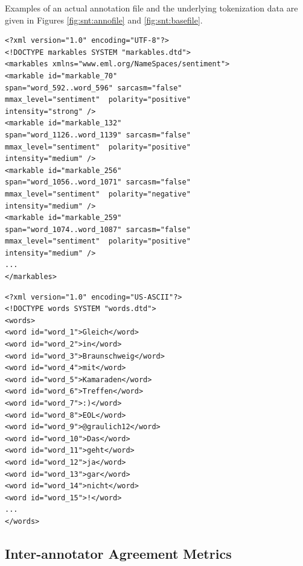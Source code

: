 Examples of an actual annotation file and the underlying tokenization
data are given in Figures \ref{fig:snt:annofile} and
\ref{fig:snt:basefile}.

\begin{minipage}[t]{\textwidth}
  \begin{minipage}[t]{0.45\textwidth}
    \lstset{language=XML}
    \begin{lstlisting}
<?xml version="1.0" encoding="UTF-8"?>
<!DOCTYPE markables SYSTEM "markables.dtd">
<markables xmlns="www.eml.org/NameSpaces/sentiment">
<markable id="markable_70"
span="word_592..word_596" sarcasm="false"
mmax_level="sentiment"  polarity="positive"
intensity="strong" />
<markable id="markable_132"
span="word_1126..word_1139" sarcasm="false"
mmax_level="sentiment"  polarity="positive"
intensity="medium" />
<markable id="markable_256"
span="word_1056..word_1071" sarcasm="false"
mmax_level="sentiment"  polarity="negative"
intensity="medium" />
<markable id="markable_259"
span="word_1074..word_1087" sarcasm="false"
mmax_level="sentiment"  polarity="positive"
intensity="medium" />
...
</markables>
    \end{lstlisting}%
  \end{minipage}\hfill%
  \begin{minipage}[t]{0.45\textwidth}%
    \lstset{language=XML}
    \begin{lstlisting}[basicstyle=\tiny]
<?xml version="1.0" encoding="US-ASCII"?>
<!DOCTYPE words SYSTEM "words.dtd">
<words>
<word id="word_1">Gleich</word>
<word id="word_2">in</word>
<word id="word_3">Braunschweig</word>
<word id="word_4">mit</word>
<word id="word_5">Kamaraden</word>
<word id="word_6">Treffen</word>
<word id="word_7">:)</word>
<word id="word_8">EOL</word>
<word id="word_9">@graulich12</word>
<word id="word_10">Das</word>
<word id="word_11">geht</word>
<word id="word_12">ja</word>
<word id="word_13">gar</word>
<word id="word_14">nicht</word>
<word id="word_15">!</word>
...
</words>
    \end{lstlisting}%
  \end{minipage}
\end{minipage}

\subsection{Inter-annotator Agreement Metrics}\label{subsec:snt:iaa}

